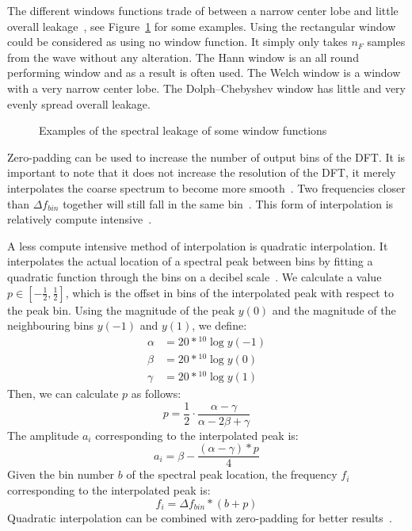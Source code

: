 \documentclass[10pt,twocolumn]{article}
\begin{document}
The different windows functions trade of between a narrow center lobe and little overall leakage~\cite{windowfunc}, see Figure~\ref{fig:windowfunceffect} for some examples. Using the rectangular window could be considered as using no window function. It simply only takes $n_F$ samples from the wave without any alteration. The Hann window is an all round performing window and as a result is often used. The Welch window is a window with a very narrow center lobe. The Dolph–Chebyshev window has little and very evenly spread overall leakage.
\begin{figure}[H]
    \centering
    \caption{Examples of the spectral leakage of some window functions}
    \label{fig:windowfunceffect}
\end{figure}

Zero-padding can be used to increase the number of output bins of the DFT. It is important to note that it does not increase the resolution of the DFT, it merely interpolates the coarse spectrum to become more smooth~\cite{zeropad1}. Two frequencies closer than $\Delta f_{bin}$ together will still fall in the same bin~\cite{zeropad2}. This form of interpolation is relatively compute intensive~\cite{interpolnozero}.

A less compute intensive method of interpolation is quadratic interpolation. It interpolates the actual location of a spectral peak between bins by fitting a quadratic function through the bins on a decibel scale~\cite{interpol}. We calculate a value $p \in [-\frac{1}{2}, \frac{1}{2}]$, which is the offset in bins of the interpolated peak with respect to the peak bin. Using the magnitude of the peak $y(0)$ and the magnitude of the neighbouring bins $y(-1)$ and $y(1)$, we define:
\begin{align*}
    \alpha &= 20 * {}^{10}\!\log{y(-1)} \\
    \beta  &= 20 * {}^{10}\!\log{y(0)} \\
    \gamma &= 20 * {}^{10}\!\log{y(1)}
\end{align*}
Then, we can calculate $p$ as follows:
\[ p = \frac{1}{2} \cdot \frac{\alpha - \gamma}{\alpha - 2\beta + \gamma} \]
The amplitude $a_i$ corresponding to the interpolated peak is:
\[ a_i = \beta - \frac{(\alpha - \gamma) * p}{4} \]
Given the bin number $b$ of the spectral peak location, the frequency $f_i$ corresponding to the interpolated peak is:
\[ f_i = \Delta f_{bin} * (b + p) \]
Quadratic interpolation can be combined with zero-padding for better results~\cite{interpolnozero}.
\end{document}
